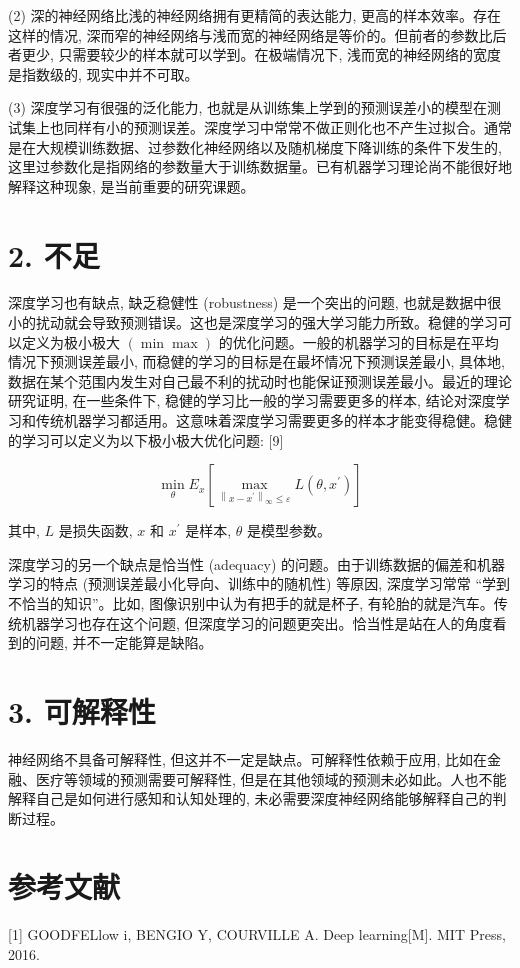 \documentclass[10pt]{article}
\begin{document}
(2) 深的神经网络比浅的神经网络拥有更精简的表达能力, 更高的样本效率。存在这样的情况, 深而窄的神经网络与浅而宽的神经网络是等价的。但前者的参数比后者更少, 只需要较少的样本就可以学到。在极端情况下, 浅而宽的神经网络的宽度是指数级的, 现实中并不可取。

(3) 深度学习有很强的泛化能力, 也就是从训练集上学到的预测误差小的模型在测试集上也同样有小的预测误差。深度学习中常常不做正则化也不产生过拟合。通常是在大规模训练数据、过参数化神经网络以及随机梯度下降训练的条件下发生的, 这里过参数化是指网络的参数量大于训练数据量。已有机器学习理论尚不能很好地解释这种现象, 是当前重要的研究课题。

\section*{2. 不足}
深度学习也有缺点, 缺乏稳健性 (robustness) 是一个突出的问题, 也就是数据中很小的扰动就会导致预测错误。这也是深度学习的强大学习能力所致。稳健的学习可以定义为极小极大 $(\min \max )$ 的优化问题。一般的机器学习的目标是在平均情况下预测误差最小, 而稳健的学习的目标是在最坏情况下预测误差最小, 具体地, 数据在某个范围内发生对自己最不利的扰动时也能保证预测误差最小。最近的理论研究证明, 在一些条件下, 稳健的学习比一般的学习需要更多的样本, 结论对深度学习和传统机器学习都适用。这意味着深度学习需要更多的样本才能变得稳健。稳健的学习可以定义为以下极小极大优化问题: [9]

$$
\min _{\theta} E_{x}\left[\max _{\left\|x-x^{\prime}\right\|_{\infty} \leqslant \varepsilon} L\left(\theta, x^{\prime}\right)\right]
$$

其中, $L$ 是损失函数, $x$ 和 $x^{\prime}$ 是样本, $\theta$ 是模型参数。

深度学习的另一个缺点是恰当性 (adequacy) 的问题。由于训练数据的偏差和机器学习的特点 (预测误差最小化导向、训练中的随机性) 等原因, 深度学习常常 “学到不恰当的知识”。比如, 图像识别中认为有把手的就是杯子, 有轮胎的就是汽车。传统机器学习也存在这个问题, 但深度学习的问题更突出。恰当性是站在人的角度看到的问题, 并不一定能算是缺陷。

\section*{3. 可解释性}
神经网络不具备可解释性, 但这并不一定是缺点。可解释性依赖于应用, 比如在金融、医疗等领域的预测需要可解释性, 但是在其他领域的预测未必如此。人也不能解释自己是如何进行感知和认知处理的, 未必需要深度神经网络能够解释自己的判断过程。

\section*{参考文献}
[1] GOODFELlow i, BENGIO Y, COURVILLE A. Deep learning[M]. MIT Press, 2016.
\end{document}
